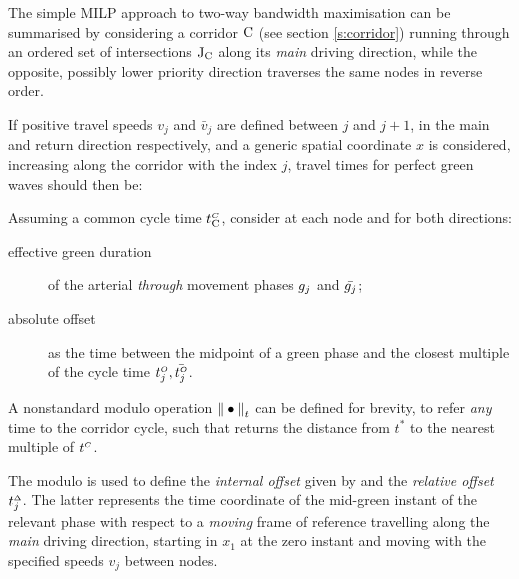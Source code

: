 The simple MILP approach to two-way bandwidth maximisation can be summarised by considering a corridor $\mathrm{C}$ (see section \ref{s:corridor}) running through an ordered set of intersections $\mathrm{J}_{\mathrm{C}}$ along its \emph{main} driving direction, while the opposite,
possibly lower priority direction traverses the same nodes in reverse order.

If positive travel speeds $v_j$ and $\bar{v}_j$ are defined between $j$ and $j+1$,
in the main and return direction respectively, and a generic spatial coordinate $x$ is considered, increasing along the corridor with the index $j$, travel times for perfect green waves should then be:


Assuming a common cycle time $t_{\mathrm{C}}^{\scriptscriptstyle{C}}$, consider at each node and for both directions:
\begin{description}
\item[effective green duration] of the arterial \emph{through} movement phases $g_{j}$ and $\bar{g_{j}}$;
\item[absolute offset] as the time between the midpoint of a green phase and the closest multiple of the cycle time $t_{j}^{\scriptscriptstyle{O}}, \bar{t_{j}^{\scriptscriptstyle{O}}}$.
\end{description}

A nonstandard modulo operation ${\| \bullet \|}_t$ can be defined for brevity, to refer \emph{any} time to the corridor cycle, such that
\eq{e:milp2}{\tmod{t^*}
\in \left] 
-\frac{\cycle{}}{2} , \frac{\cycle{}}{2} \right]
}
returns the distance from $t^*$ to the nearest multiple of $t_{}^{\scriptscriptstyle{C}}$.

The modulo is used to define the \emph{internal offset} given by
and the \emph{relative offset} $t_{j}^{\scriptscriptstyle{\Delta}}$. The latter represents the time coordinate of the mid-green instant of the relevant phase with respect to a \emph{moving} frame of reference travelling along the \emph{main} driving direction, starting in $x_1$ at the zero instant and moving with the specified speeds $v_j$ between nodes.



